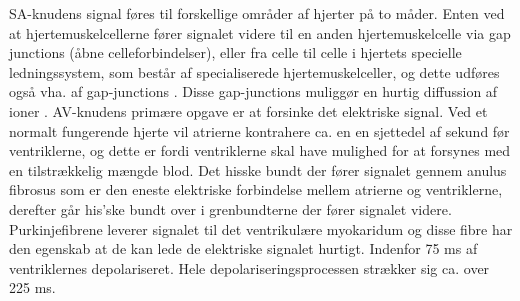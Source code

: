 SA-knudens signal føres til forskellige områder af hjerter på to måder. Enten ved at hjertemuskelcellerne fører signalet videre til en anden hjertemuskelcelle via gap junctions (åbne celleforbindelser), eller fra celle til celle i hjertets specielle ledningssystem, som består af specialiserede hjertemuskelceller, og dette udføres også vha. af gap-junctions \cite{gronanatomi}. 
Disse gap-junctions muliggør en hurtig diffussion af ioner \cite{guyton}.
AV-knudens primære opgave er at  forsinke det elektriske signal. Ved et normalt fungerende hjerte vil atrierne kontrahere ca. en en sjettedel af sekund før ventriklerne, og dette er fordi ventriklerne skal have mulighed for at forsynes med en tilstrækkelig mængde blod\cite{guyton}.
Det hisske bundt der fører signalet gennem anulus fibrosus som er den eneste elektriske forbindelse mellem atrierne og ventriklerne, derefter går his'ske bundt over i grenbundterne der fører signalet videre. Purkinjefibrene leverer signalet til det ventrikulære myokaridum og disse fibre har den egenskab at de kan lede de elektriske signalet hurtigt. Indenfor 75 ms af ventriklernes depolariseret\cite{gronanatomi}. Hele depolariseringsprocessen strækker sig ca. over 225 ms.



